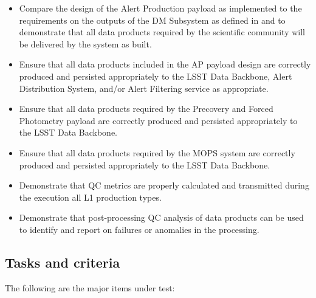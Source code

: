 \documentclass[DM,STS,toc]{lsstdoc}
\begin{document}
\begin{itemize}

  \item{Compare the design of the Alert Production payload as
  implemented to the requirements on the outputs of the DM Subsystem as
  defined in  and  to demonstrate that all data
  products required by the scientific community will be delivered by the
  system as built.}

  \item{Ensure that all data products included in the AP payload design are
  correctly produced and persisted appropriately to the LSST
  Data Backbone, Alert Distribution System, and/or Alert Filtering service
  as appropriate.}

  \item{Ensure that all data products required by the Precovery and Forced
  Photometry payload are correctly
  produced and persisted appropriately to the LSST Data Backbone.}

  \item{Ensure that all data products required by the MOPS system are correctly
  produced and persisted appropriately to the LSST Data Backbone.}

  \item{Demonstrate that QC metrics are properly calculated and transmitted
  during the execution all L1 production types.}

  \item{Demonstrate that post-processing QC analysis of data products can be
  used to identify and report on failures or anomalies in the processing.}

\end{itemize}

\subsection{Tasks and criteria}
\label{sec:tasks}

The following are the major items under test:
\end{document}
